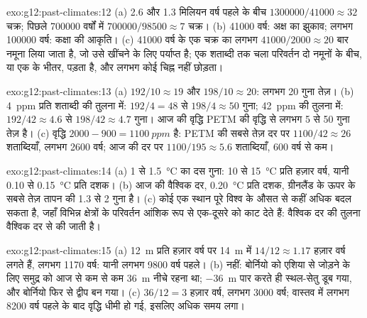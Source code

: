 \begin{solution}{exo:g12:past-climates:12}
(a) 2.6 और 1.3 मिलियन वर्ष पहले के बीच $\num{1300000}/\num{41000} \approx 32$
चक्र; पिछले \num{700000} वर्षों में $\num{700000}/\num{98500} \approx 7$
चक्र। (b) \num{41000} वर्ष: अक्ष का झुकाव; लगभग
\num{100000} वर्ष: कक्षा की आकृति। (c) \num{41000} वर्ष के एक चक्र
का लगभग $\num{41000}/\num{2000} \approx 20$ बार नमूना लिया जाता है, जो उसे खींचने के लिए पर्याप्त है;
एक शताब्दी तक चला परिवर्तन दो नमूनों के बीच, या एक के भीतर, पड़ता है, और
लगभग कोई चिह्न नहीं छोड़ता।
\end{solution}

\begin{solution}{exo:g12:past-climates:13}
(a) $192/10 \approx 19$ और $198/10 \approx 20$: लगभग 20 गुना तेज़।
(b) \qty{4}{ppm} प्रति शताब्दी की तुलना में: $192/4 = 48$ से $198/4 \approx 50$
गुना; \qty{42}{ppm} की तुलना में: $192/42 \approx 4.6$ से $198/42 \approx 4.7$
गुना। आज की वृद्धि PETM की वृद्धि से लगभग 5 से 50 गुना तेज़ है।
(c) वृद्धि $2000 - 900 = \qty{1100}{ppm}$ है: PETM की सबसे तेज़ दर पर $1100/42 \approx 26$ शताब्दियाँ,
लगभग \num{2600} वर्ष; आज की दर पर $1100/195 \approx 5.6$
शताब्दियाँ, 600 वर्ष से कम।
\end{solution}

\begin{solution}{exo:g12:past-climates:14}
(a) 1 से \qty{1.5}{\degreeCelsius} का दस गुना: 10 से \qty{15}{\degreeCelsius}
प्रति हज़ार वर्ष, यानी 0.10 से \qty{0.15}{\degreeCelsius} प्रति दशक।
(b) आज की वैश्विक दर, \qty{0.20}{\degreeCelsius} प्रति दशक, ग्रीनलैंड के ऊपर के सबसे तेज़ तापन की 1.3 से 2
गुना है। (c) कोई एक स्थान पूरे विश्व के औसत से कहीं अधिक
बदल सकता है, जहाँ विभिन्न क्षेत्रों के परिवर्तन आंशिक रूप से
एक-दूसरे को काट देते हैं: वैश्विक दर की तुलना वैश्विक दर से की जाती है।
\end{solution}

\begin{solution}{exo:g12:past-climates:15}
(a) \qty{12}{m} प्रति हज़ार वर्ष पर \qty{14}{m} में $14/12 \approx
1.17$ हज़ार वर्ष लगते हैं, लगभग \num{1170} वर्ष: यानी लगभग \num{9800} वर्ष पहले।
(b) नहीं: बोर्नियो को एशिया से जोड़ने के लिए समुद्र को आज से कम से कम \qty{36}{m} नीचे
रहना था; \qty{-36}{m} पार करते ही स्थल-सेतु डूब गया, और
बोर्नियो फिर से द्वीप बन गया। (c) $36/12 = 3$ हज़ार वर्ष, लगभग
\num{3000} वर्ष; वास्तव में लगभग \num{8200} वर्ष पहले के बाद वृद्धि धीमी हो गई,
इसलिए अधिक समय लगा।
\end{solution}

